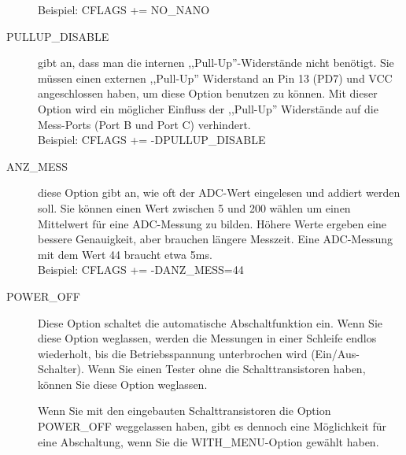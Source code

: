 \begin{description}
Beispiel: CFLAGS += NO\_NANO
  \item[PULLUP\_DISABLE] gibt an, dass man die internen ,,Pull-Up''-Widerstände nicht benötigt.
 Sie müssen einen externen ,,Pull-Up'' Widerstand an Pin 13 (PD7) und VCC angeschlossen haben, um diese
Option benutzen zu können.
Mit dieser Option wird ein möglicher Einfluss der ,,Pull-Up'' Widerstände auf die Mess-Ports (Port B und Port C) verhindert.\\
Beispiel: CFLAGS += -DPULLUP\_DISABLE
  \item[ANZ\_MESS] diese Option gibt an, wie oft der ADC-Wert eingelesen und addiert werden soll.
Sie können einen Wert zwischen 5 und 200 wählen um einen Mittelwert für eine ADC-Messung zu bilden.
Höhere Werte ergeben eine bessere Genauigkeit, aber brauchen längere Messzeit.
Eine ADC-Messung mit dem Wert 44 braucht etwa 5ms.\\
Beispiel: CFLAGS += -DANZ\_MESS=44
  \item[POWER\_OFF] Diese Option schaltet die automatische Abschaltfunktion ein.
Wenn Sie diese Option weglassen, werden die Messungen in einer Schleife endlos wiederholt, bis die Betriebsspannung 
unterbrochen wird (Ein/Aus-Schalter).
Wenn Sie einen Tester ohne die Schalttransistoren haben, können Sie diese Option weglassen.

Wenn Sie mit den eingebauten Schalttransistoren die Option POWER\_OFF weggelassen haben,
gibt es dennoch eine Möglichkeit für eine Abschaltung, wenn Sie die WITH\_MENU-Option gewählt haben.


\end{description}
